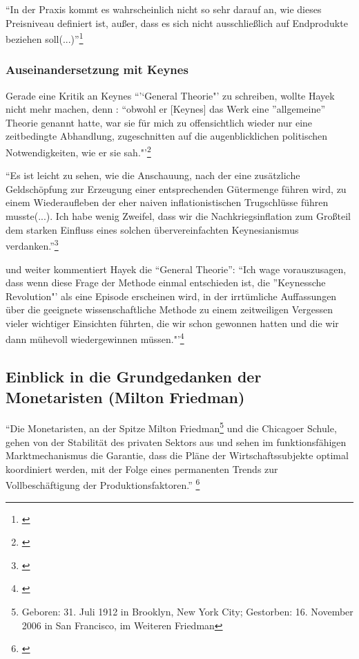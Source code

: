 \documentclass[
        onecolumn,
        a4paper,
        abstracton,
        parskip=half
        ,final
        ]{scrartcl}
\begin{document}
"`In der Praxis kommt es wahrscheinlich nicht so sehr darauf an, wie dieses Preisniveau definiert ist, außer, dass es sich nicht ausschließlich auf Endprodukte beziehen soll(...)"'\footnote[426]{\citep*[S.423]{hayek1971}}

\subsubsection{Auseinandersetzung mit Keynes}

Gerade eine Kritik an Keynes "`'`General Theorie"' zu schreiben, wollte Hayek nicht mehr machen, denn : "`obwohl er [Keynes] das Werk eine "'allgemeine"' Theorie genannt hatte, war sie f{\"u}r mich zu offensichtlich wieder nur eine zeitbedingte Abhandlung, zugeschnitten auf die augenblicklichen politischen Notwendigkeiten, wie er sie sah."'\footnote[427]{\citep*[S.91]{Hayek1969}}

"`Es ist leicht zu sehen, wie die Anschauung, nach der eine zus{\"a}tzliche Geldsch{\"o}pfung zur Erzeugung einer entsprechenden G{\"u}termenge f{\"u}hren wird, zu einem Wiederaufleben der eher naiven inflationistischen Trugschl{\"u}sse f{\"u}hren musste(...). Ich habe wenig Zweifel, dass wir die Nachkriegsinflation zum Großteil dem starken Einfluss eines solchen {\"u}bervereinfachten Keynesianismus verdanken."'\footnote[428]{\citep*[S.93]{Hayek1969}}

und weiter kommentiert Hayek die "`General Theorie"':
"`Ich wage vorauszusagen, dass wenn diese Frage der Methode einmal entschieden ist, die "'Keynessche Revolution"' als eine Episode erscheinen wird, in der irrt{\"u}mliche Auffassungen {\"u}ber die geeignete wissenschaftliche Methode zu einem zeitweiligen Vergessen vieler wichtiger Einsichten f{\"u}hrten, die wir schon gewonnen hatten und die wir dann m{\"u}hevoll wiedergewinnen m{\"u}ssen."'\footnote[429]{\citep*[S.96]{Hayek1969}}











\subsection{Einblick in die Grundgedanken der Monetaristen (Milton Friedman)} %


"`Die Monetaristen, an der Spitze Milton Friedman\footnote[16]{Geboren: 31. Juli 1912 in Brooklyn, New York City; Gestorben: 16. November 2006 in San Francisco, im Weiteren Friedman} und die Chicagoer Schule,
gehen von der Stabilit{\"a}t des privaten Sektors aus und sehen im
funktionsf{\"a}higen Marktmechanismus die Garantie, dass die Pl{\"a}ne der
Wirtschaftssubjekte optimal koordiniert werden, mit der Folge eines
permanenten Trends zur Vollbesch{\"a}ftigung der Produktionsfaktoren."' \footnote[501]{\citep*[vgl.][S.210]{peters2000}}
\end{document}
